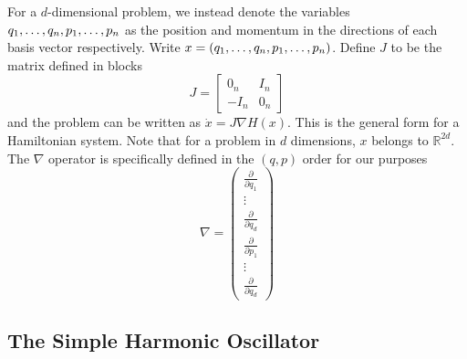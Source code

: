 For a $d$-dimensional problem,
we instead denote the variables $q_1, \mathellipsis, q_n, p_1, \mathellipsis, p_n$ as the position and momentum in the directions of each basis vector respectively.
Write $x = (q_1, \mathellipsis, q_n, p_1, \mathellipsis, p_n)$.
Define $J$ to be the matrix defined in blocks
\begin{equation}
	J = \begin{bmatrix}
		{0}_n & {I}_n \\
		-{I}_n & {0}_n
	\end{bmatrix}
\end{equation}
and the problem can be written as ${\dot{x}} = {J}\nabla H({x})$.
This is the general form for a Hamiltonian system.
Note that for a problem in $d$ dimensions,
$x$ belongs to $\mathds{R}^{2d}$.
The $\nabla$ operator is specifically defined in the $(q,p)$ order for our purposes
\begin{equation*}
	\nabla = \begin{pmatrix}
		\frac{\partial}{\partial q_1} \\
		\vdots \\
		\frac{\partial}{\partial q_d} \\
		\frac{\partial}{\partial p_1} \\
		\vdots \\
		\frac{\partial}{\partial q_d}
	\end{pmatrix}
\end{equation*}

\subsection{The Simple Harmonic Oscillator}

